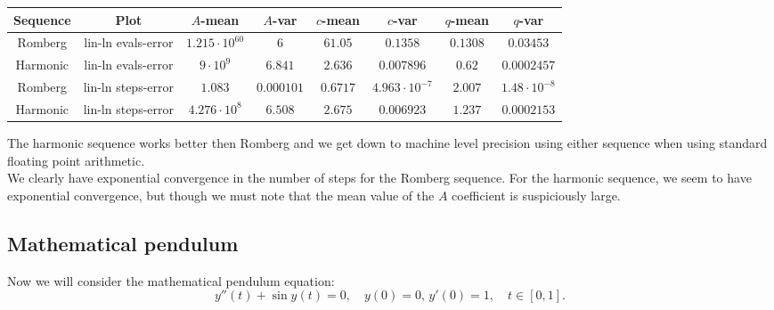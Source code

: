 \begin{table}[H]
    \centering
    \small
     \begin{tabular}{c|c||c|c|c|c|c|c}
Sequence & Plot & \(A\)-mean & \(A\)-var & \(c\)-mean & \(c\)-var & \(q\)-mean & \(q\)-var\\\hline
Romberg & lin-ln evals-error & \(1.215\cdot 10^{60}\) & \(6\) & \(61.05\) & \(0.1358\) & \(0.1308\) & \(0.03453\) \\
Harmonic & lin-ln evals-error & \(9\cdot 10^9\) & \(6.841\) & \(2.636\) & \(0.007896\) & \(0.62\) & \(0.0002457\) \\
Romberg & lin-ln steps-error & \(1.083\) & \(0.000101\) & \(0.6717\) & \(4.963\cdot 10^{-7}\) & \(2.007\) & \(1.48\cdot 10^{-8}\) \\
Harmonic & lin-ln steps-error & \(4.276\cdot 10^8\) & \(6.508\) & \(2.675\) & \(0.006923\) & \(1.237\) & \(0.0002153\) \\
    \end{tabular}
    \label{tab:my_label}
\end{table}

The harmonic sequence works better then Romberg and we get down to machine level precision using either sequence when using standard floating point arithmetic.\\

We clearly have exponential convergence in the number of steps for the Romberg sequence. For the harmonic sequence, we seem to have exponential convergence, but though we must note that the mean value of the \(A\) coefficient is suspiciously large.

\subsection{Mathematical pendulum}

Now we will consider the mathematical pendulum equation:
\begin{equation}
y''(t) + \sin y(t) = 0,\quad y(0) = 0,\, y'(0) = 1, \quad t\in [0,1].
\end{equation}

